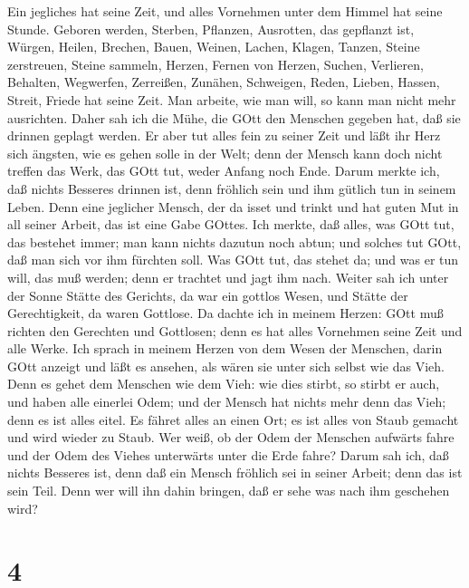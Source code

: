 Ein jegliches hat seine Zeit, und alles Vornehmen unter dem
Himmel hat seine Stunde.  Geboren werden, Sterben, Pflanzen,
Ausrotten, das gepflanzt ist,  Würgen, Heilen, Brechen,
Bauen,  Weinen, Lachen, Klagen, Tanzen,  Steine
zerstreuen, Steine sammeln, Herzen, Fernen von Herzen, 
Suchen, Verlieren, Behalten, Wegwerfen,  Zerreißen, Zunähen,
Schweigen, Reden,  Lieben, Hassen, Streit, Friede hat seine
Zeit.  Man arbeite, wie man will, so kann man nicht mehr
ausrichten.  Daher sah ich die Mühe, die GOtt den Menschen
gegeben hat, daß sie drinnen geplagt werden.  Er aber tut
alles fein zu seiner Zeit und läßt ihr Herz sich ängsten, wie es gehen
solle in der Welt; denn der Mensch kann doch nicht treffen das Werk, das
GOtt tut, weder Anfang noch Ende.  Darum merkte ich, daß
nichts Besseres drinnen ist, denn fröhlich sein und ihm gütlich tun in
seinem Leben.  Denn eine jeglicher Mensch, der da isset und
trinkt und hat guten Mut in all seiner Arbeit, das ist eine Gabe GOttes.
 Ich merkte, daß alles, was GOtt tut, das bestehet immer;
man kann nichts dazutun noch abtun; und solches tut GOtt, daß man sich
vor ihm fürchten soll.  Was GOtt tut, das stehet da; und
was er tun will, das muß werden; denn er trachtet und jagt ihm nach.
 Weiter sah ich unter der Sonne Stätte des Gerichts, da war
ein gottlos Wesen, und Stätte der Gerechtigkeit, da waren Gottlose.
 Da dachte ich in meinem Herzen: GOtt muß richten den
Gerechten und Gottlosen; denn es hat alles Vornehmen seine Zeit und alle
Werke.  Ich sprach in meinem Herzen von dem Wesen der
Menschen, darin GOtt anzeigt und läßt es ansehen, als wären sie unter
sich selbst wie das Vieh.  Denn es gehet dem Menschen wie
dem Vieh: wie dies stirbt, so stirbt er auch, und haben alle einerlei
Odem; und der Mensch hat nichts mehr denn das Vieh; denn es ist alles
eitel.  Es fähret alles an einen Ort; es ist alles von
Staub gemacht und wird wieder zu Staub.  Wer weiß, ob der
Odem der Menschen aufwärts fahre und der Odem des Viehes unterwärts
unter die Erde fahre?  Darum sah ich, daß nichts Besseres
ist, denn daß ein Mensch fröhlich sei in seiner Arbeit; denn das ist
sein Teil. Denn wer will ihn dahin bringen, daß er sehe was nach ihm
geschehen wird?

\hypertarget{section-3}{%
\section{4}\label{section-3}}

